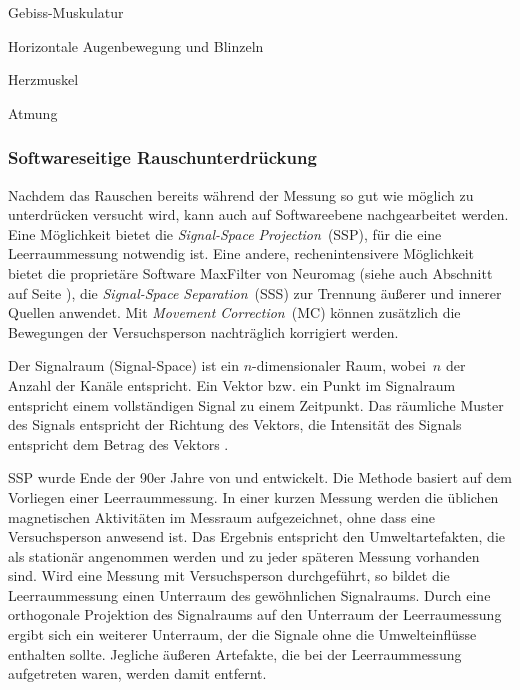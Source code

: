 \documentclass[doc,a4paper,12pt]{apa6}
\makeatletter
\DeclareRobustCommand*{\nameref}[1]{%
      \glqq{\myorg@nameref{#1}}\grqq%
    }%
\makeatother
\begin{document}
\begin{compactitem}
\item Gebiss-Muskulatur
\item Horizontale Augenbewegung und Blinzeln
\item Herzmuskel
\item Atmung
\end{compactitem}

\subsubsection{Softwareseitige Rauschunterdrückung}
\label{sec:maxfilter}

Nachdem das Rauschen bereits während der Messung so gut wie möglich zu unterdrücken versucht wird, kann auch auf Softwareebene nachgearbeitet werden. Eine Möglichkeit bietet die \emph{Signal-Space Projection}~(SSP), für die eine Leerraummessung notwendig ist. Eine andere, rechenintensivere Möglichkeit bietet die proprietäre Software MaxFilter von Neuromag (siehe auch Abschnitt \nameref{sec:software} auf Seite \pageref{sec:software}), die \emph{Signal-Space Separation}~(SSS) zur Trennung äußerer und innerer Quellen anwendet. Mit \emph{Movement Correction}~(MC) können zusätzlich die Bewegungen der Versuchsperson nachträglich korrigiert werden.

Der Signalraum (Signal-Space) ist ein $n$-dimensionaler Raum, wobei~$n$ der Anzahl der Kanäle entspricht. Ein Vektor bzw. ein Punkt im Signalraum entspricht einem vollständigen Signal zu einem Zeitpunkt. Das räumliche Muster des Signals entspricht der Richtung des Vektors, die Intensität des Signals entspricht dem Betrag des Vektors \parencite{hansen2010meg}.

SSP wurde Ende der 90er Jahre von \textcite{uusitalo1997signal} und \textcite{parkkonen1999interference} entwickelt. Die Methode basiert auf dem Vorliegen einer Leerraummessung. In einer kurzen Messung werden die üblichen magnetischen Aktivitäten im Messraum aufgezeichnet, ohne dass eine Versuchsperson anwesend ist. Das Ergebnis entspricht den Umweltartefakten, die als stationär angenommen werden und zu jeder späteren Messung vorhanden sind. Wird eine Messung mit Versuchsperson durchgeführt, so bildet die Leerraummessung einen Unterraum des gewöhnlichen Signalraums. Durch eine orthogonale Projektion des Signalraums auf den Unterraum der Leerraumessung ergibt sich ein weiterer Unterraum, der die Signale ohne die Umwelteinflüsse enthalten sollte. Jegliche äußeren Artefakte, die bei der Leerraummessung aufgetreten waren, werden damit entfernt.
\end{document}

